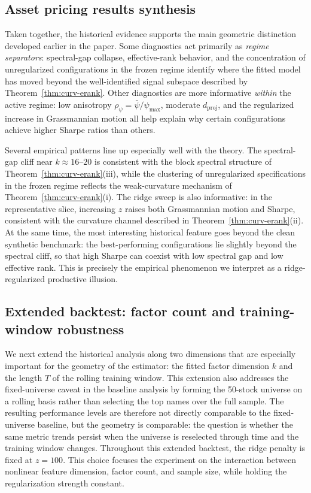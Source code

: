 \documentclass[11pt,letterpaper]{article}
\begin{document}
\subsection{Asset pricing results synthesis}
\label{sec:hist:summary}

Taken together, the historical evidence supports the main geometric distinction developed earlier in the paper. Some diagnostics act primarily as \emph{regime separators}: spectral-gap collapse, effective-rank behavior, and the concentration of unregularized configurations in the frozen regime identify where the fitted model has moved beyond the well-identified signal subspace described by Theorem~\ref{thm:curv-erank}. Other diagnostics are more informative \emph{within} the active regime: low anisotropy $\rho_\psi=\bar\psi/\psi_{\max}$, moderate $d_{\mathrm{proj}}$, and the regularized increase in Grassmannian motion all help explain why certain configurations achieve higher Sharpe ratios than others.

Several empirical patterns line up especially well with the theory. The spectral-gap cliff near $k\approx 16$--$20$ is consistent with the block spectral structure of Theorem~\ref{thm:curv-erank}(iii), while the clustering of unregularized specifications in the frozen regime reflects the weak-curvature mechanism of Theorem~\ref{thm:curv-erank}(i). The ridge sweep is also informative: in the representative slice, increasing $z$ raises both Grassmannian motion and Sharpe, consistent with the curvature channel described in Theorem~\ref{thm:curv-erank}(ii). At the same time, the most interesting historical feature goes beyond the clean synthetic benchmark: the best-performing configurations lie slightly beyond the spectral cliff, so that high Sharpe can coexist with low spectral gap and low effective rank. This is precisely the empirical phenomenon we interpret as a ridge-regularized productive illusion.


\subsection{Extended backtest: factor count and training-window robustness}
\label{sec:extended}

We next extend the historical analysis along two dimensions that are especially
important for the geometry of the estimator: the fitted factor dimension $k$
and the length $T$ of the rolling training window. This extension also addresses
the fixed-universe caveat in the baseline analysis by forming the 50-stock
universe on a rolling basis rather than selecting the top names over the full
sample. The resulting performance levels are therefore not directly comparable
to the fixed-universe baseline, but the geometry is comparable: the question is
whether the same metric trends persist when the universe is reselected through
time and the training window changes. Throughout this extended backtest, the
ridge penalty is fixed at $z=100$. This choice focuses the experiment on the
interaction between nonlinear feature dimension, factor count, and sample size,
while holding the regularization strength constant.
\end{document}
